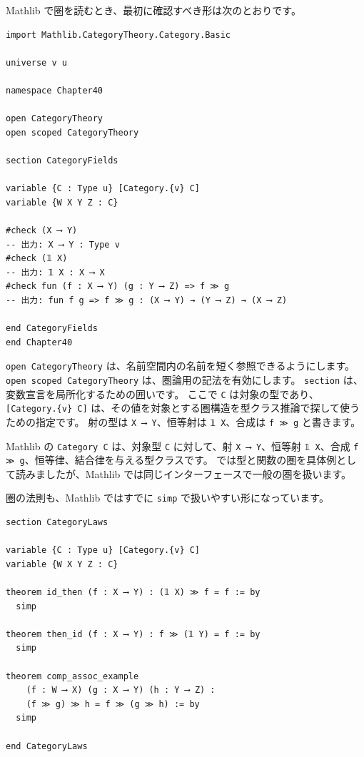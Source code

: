 Mathlib で圏を読むとき、最初に確認すべき形は次のとおりです。

\begin{listing}[htbp]
\begin{verbatim}
import Mathlib.CategoryTheory.Category.Basic

universe v u

namespace Chapter40

open CategoryTheory
open scoped CategoryTheory

section CategoryFields

variable {C : Type u} [Category.{v} C]
variable {W X Y Z : C}

#check (X ⟶ Y)
-- 出力: X ⟶ Y : Type v
#check (𝟙 X)
-- 出力: 𝟙 X : X ⟶ X
#check fun (f : X ⟶ Y) (g : Y ⟶ Z) => f ≫ g
-- 出力: fun f g => f ≫ g : (X ⟶ Y) → (Y ⟶ Z) → (X ⟶ Z)

end CategoryFields
end Chapter40
\end{verbatim}
\caption{\texttt{Category} の基本記法}
\label{lst:ch40_category_basic}
\end{listing}

\texttt{open CategoryTheory} は、名前空間内の名前を短く参照できるようにします。
\texttt{open scoped CategoryTheory} は、圏論用の記法を有効にします。
\texttt{section} は、変数宣言を局所化するための囲いです。
ここで \texttt{C} は対象の型であり、\texttt{[Category.\{v\} C]} は、その値を対象とする圏構造を型クラス推論で探して使うための指定です。
射の型は \texttt{X ⟶ Y}、恒等射は \texttt{𝟙 X}、合成は \texttt{f ≫ g} と書きます。

Mathlib の \texttt{Category C} は、対象型 \texttt{C} に対して、射 \texttt{X ⟶ Y}、恒等射 \texttt{𝟙 X}、合成 \texttt{f ≫ g}、恒等律、結合律を与える型クラスです。
では型と関数の圏を具体例として読みましたが、Mathlib では同じインターフェースで一般の圏を扱います。

圏の法則も、Mathlib ではすでに \texttt{simp} で扱いやすい形になっています。

\begin{listing}[htbp]
\begin{verbatim}
section CategoryLaws

variable {C : Type u} [Category.{v} C]
variable {W X Y Z : C}

theorem id_then (f : X ⟶ Y) : (𝟙 X) ≫ f = f := by
  simp

theorem then_id (f : X ⟶ Y) : f ≫ (𝟙 Y) = f := by
  simp

theorem comp_assoc_example
    (f : W ⟶ X) (g : X ⟶ Y) (h : Y ⟶ Z) :
    (f ≫ g) ≫ h = f ≫ (g ≫ h) := by
  simp

end CategoryLaws
\end{verbatim}
\caption{\texttt{id\_then}・\texttt{then\_id}・\texttt{comp\_assoc\_example}}
\label{lst:ch40_category_laws}
\end{listing}

